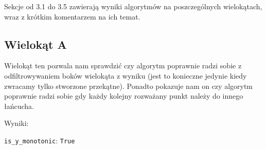\documentclass[11pt,a4paper]{article}
\begin{document}
Sekcje od 3.1 do 3.5 zawierają wyniki algorytmów na poszczególnych
wielokątach, wraz z krótkim komentarzem na ich temat.

\pagebreak

\subsection{Wielokąt A}
Wielokąt ten pozwala nam sprawdzić czy algorytm poprawnie
radzi sobie z odfiltrowywaniem boków wielokąta z wyniku
(jest to konieczne jedynie kiedy zwracamy tylko 
stworzone przekątne). Ponadto pokazuje nam on czy algorytm
poprawnie radzi sobie gdy każdy kolejny rozważany
punkt należy do innego łańcucha.

Wyniki:

\verb|is_y_monotonic|: \verb|True|
\end{document}
